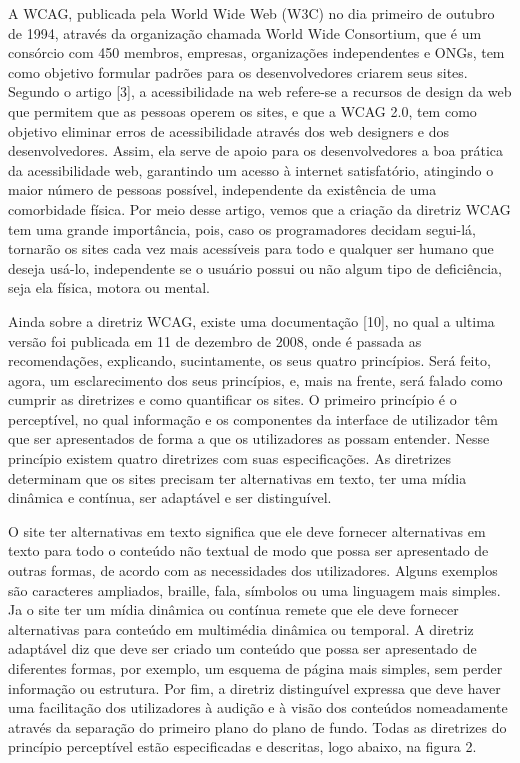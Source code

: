 \documentclass[a4paper]{article}
\begin{document}
\begin{titlepage}
A WCAG, publicada pela World Wide Web (W3C) no dia primeiro de outubro de 1994, através da organização chamada World Wide Consortium, que é um consórcio com 450 membros, empresas, organizações independentes e ONGs, tem como objetivo formular padrões para os desenvolvedores criarem seus sites. Segundo o artigo [3], a acessibilidade na web refere-se a recursos de design da web que permitem que as pessoas operem os sites, e que a WCAG 2.0, tem como objetivo eliminar erros de acessibilidade através dos web designers e dos desenvolvedores. Assim, ela serve de apoio para os desenvolvedores a boa prática da acessibilidade web, garantindo um acesso à internet satisfatório, atingindo o maior número de pessoas possível, independente da existência de uma comorbidade física. Por meio desse artigo, vemos que a criação da diretriz WCAG tem uma grande importância, pois, caso os programadores decidam segui-lá, tornarão os sites cada vez mais acessíveis para todo e qualquer ser humano que deseja usá-lo, independente se o usuário possui ou não algum tipo de deficiência, seja ela física, motora ou mental. 

Ainda sobre a diretriz WCAG, existe uma documentação [10], no qual a ultima versão foi publicada em 11 de dezembro de 2008, onde é passada as recomendações, explicando, sucintamente, os seus quatro princípios. Será feito, agora, um esclarecimento dos seus princípios, e, mais na frente, será falado como cumprir as diretrizes e como quantificar os sites. O primeiro princípio é o perceptível, no qual informação e os componentes da interface de utilizador têm que ser apresentados de forma a que os utilizadores as possam entender. Nesse princípio existem quatro diretrizes com suas especificações. As diretrizes determinam que os sites precisam ter alternativas em texto, ter uma mídia dinâmica e contínua, ser adaptável e ser distinguível.

O site ter alternativas em texto significa que ele deve fornecer alternativas em texto para todo o conteúdo não textual de modo que possa ser apresentado de outras formas, de acordo com as necessidades dos utilizadores. Alguns exemplos são caracteres ampliados, braille, fala, símbolos ou uma linguagem mais simples. Ja o site ter um mídia dinâmica ou contínua remete que ele deve fornecer alternativas para conteúdo em multimédia dinâmica ou temporal. A diretriz adaptável diz que deve ser criado um conteúdo que possa ser apresentado de diferentes formas, por exemplo, um esquema de página mais simples, sem perder informação ou estrutura. Por fim, a diretriz distinguível expressa que deve haver uma facilitação dos utilizadores à audição e à visão dos conteúdos nomeadamente através da separação do primeiro plano do plano de fundo. Todas as diretrizes do princípio perceptível estão especificadas e descritas, logo abaixo, na figura 2.\\


\end{titlepage}
\end{document}
